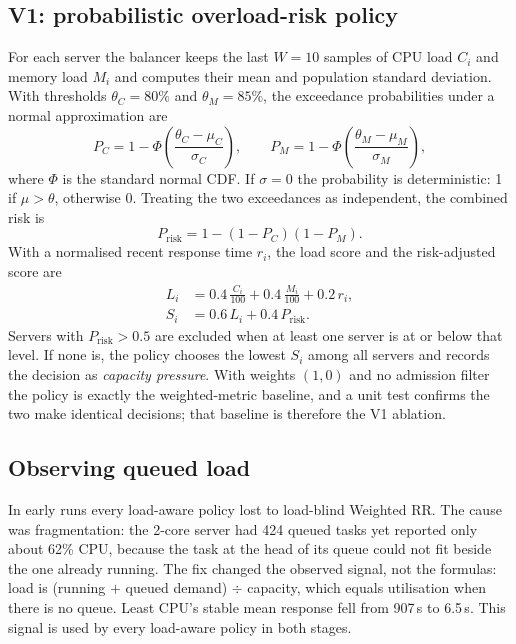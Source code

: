 \documentclass[11pt,a4paper]{article}
\newcommand{\prisk}{P_{\mathrm{risk}}}
\begin{document}
\subsection{V1: probabilistic overload-risk policy}\label{sec:v1}
For each server the balancer keeps the last $W=10$ samples of CPU load $C_i$ and memory load $M_i$ and
computes their mean and population standard deviation. With thresholds $\theta_C=80\%$ and
$\theta_M=85\%$, the exceedance probabilities under a normal approximation are
\begin{equation}
  P_C = 1-\Phi\!\left(\frac{\theta_C-\mu_C}{\sigma_C}\right),\qquad
  P_M = 1-\Phi\!\left(\frac{\theta_M-\mu_M}{\sigma_M}\right),
\end{equation}
where $\Phi$ is the standard normal CDF. If $\sigma=0$ the probability is deterministic: 1 if
$\mu>\theta$, otherwise 0. Treating the two exceedances as independent, the combined risk is
\begin{equation}
  \prisk = 1-(1-P_C)(1-P_M).
\end{equation}
With a normalised recent response time $r_i$, the load score and the risk-adjusted score are
\begin{align}
  L_i &= 0.4\,\frac{C_i}{100} + 0.4\,\frac{M_i}{100} + 0.2\,r_i, \\
  S_i &= 0.6\,L_i + 0.4\,\prisk .
\end{align}
Servers with $\prisk>0.5$ are excluded when at least one server is at or below that level. If none is, the
policy chooses the lowest $S_i$ among all servers and records the decision as \emph{capacity pressure}.
With weights $(1,0)$ and no admission filter the policy is exactly the weighted-metric baseline, and a unit test
confirms the two make identical decisions; that baseline is therefore the V1 ablation.

\subsection{Observing queued load}\label{sec:backlog}
In early runs every load-aware policy lost to load-blind Weighted RR. The cause was fragmentation: the
2-core server had 424 queued tasks yet reported only about 62\% CPU, because the task at the head of its
queue could not fit beside the one already running. The fix changed the observed signal, not the formulas:
load is (running $+$ queued demand) $\div$ capacity, which equals utilisation when there is no queue.
Least CPU's stable mean response fell from 907\,s to 6.5\,s. This signal is used by every load-aware policy
in both stages.
\end{document}
